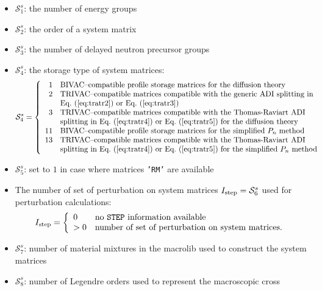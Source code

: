 \begin{itemize}
\item $\mathcal{S}^{s}_{1}$: the number of energy groups
\item $\mathcal{S}^{s}_{2}$: the order of a system matrix
\item $\mathcal{S}^{s}_{3}$: the number of delayed neutron precursor groups
\item $\mathcal{S}^{s}_{4}$: the storage type of system matrices:
\begin{displaymath}
\mathcal{S}^{s}_{4} = \left\{
\begin{array}{rl}
 1 & \textrm{BIVAC--compatible profile storage matrices for the diffusion theory} \\
 2 & \textrm{TRIVAC--compatible matrices compatible with the generic
 ADI splitting in} \\
   & \textrm{\Eq{tratr2} or \Eq{tratr3}} \\
 3 & \textrm{TRIVAC--compatible matrices compatible with the Thomas-Raviart
 ADI} \\
   & \textrm{splitting in \Eq{tratr4} or \Eq{tratr5} for the diffusion theory} \\
 11 & \textrm{BIVAC--compatible profile storage matrices for the simplified
 $P_n$ method} \\
 13 & \textrm{TRIVAC--compatible matrices compatible with the Thomas-Raviart
 ADI} \\
   & \textrm{splitting in \Eq{tratr4} or \Eq{tratr5} for the simplified $P_n$ method}
\end{array} \right.
\end{displaymath}
\item $\mathcal{S}^{s}_{5}$: set to $1$ in case where matrices {\tt 'RM'} are available
\item The number of set of perturbation on system matrices $I_{\rm step}=\mathcal{S}^{s}_{6}$ used
for perturbation calculations:
\begin{displaymath}
I_{\rm step} = \left\{
\begin{array}{ll}
0 & \textrm{no {\tt STEP} information available}\\
>0 & \textrm{number of set of perturbation on system matrices.}
\end{array} \right.
\end{displaymath}
\item $\mathcal{S}^{s}_{7}$: number of material mixtures in the macrolib used to
construct the system matrices
\item $\mathcal{S}^{s}_{8}$: number of Legendre orders used to represent the macroscopic cross

\end{itemize}
